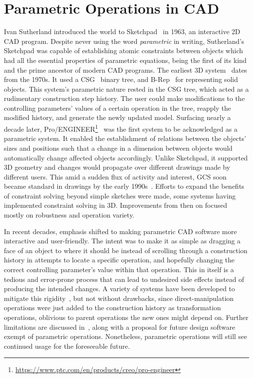 \section{Parametric Operations in CAD}%
\label{sec:intro.parametric}

Ivan Sutherland introduced the world to
Sketchpad~\cite{Sutherland:1964:Sketchpad} in 1963, an interactive 2D \ac{CAD}
program. Despite never using the word \textit{parametric} in writing,
Sutherland's Sketchpad was capable of establishing atomic constraints between
objects which had all the essential properties of parametric equations, being
the first of its kind and the prime ancestor of modern \ac{CAD} programs.  The
earliest 3D system~\cite{Requicha:1980:RRS:356827.356833} dates from the 1970s.
It used a \ac{CSG}~\cite{Requicha:1977:CSG,Foley:1996:CGPP} binary tree, and
\ac{B-Rep}~\cite{Stroud:2006:BRMT} for representing solid objects.  This
system's parametric nature rested in the \ac{CSG} tree, which acted as a
rudimentary construction step history.  The user could make modifications to the
controlling parameters' values of a certain operation in the tree, reapply the
modified history, and generate the newly updated model.  Surfacing nearly a
decade later,
Pro/ENGINEER\footnote{\url{https://www.ptc.com/en/products/creo/pro-engineer}}~\cite{Jabi:2013:PDA}
was the first system to be acknowledged as a parametric system.  It enabled the
establishment of relations between the objects' sizes and positions such that a
change in a dimension between objects would automatically change affected
objects accordingly.  Unlike Sketchpad, it supported 3D geometry and changes
would propagate over different drawings made by different users.  This amid a
sudden flux of activity and interest, \ac{GCS} soon became standard in drawings
by the early 1990s~\cite{Chung:1990:TEVPD,Owen:1991:ASGDC,Bouma:1995:GCS}.
Efforts to expand the benefits of constraint solving beyond simple sketches were
made, some systems having implemented constraint solving in 3D.  Improvements
from then on focused mostly on robustness and operation variety.

In recent decades, emphasis shifted to making parametric \ac{CAD} software more
interactive and user-friendly.  The intent was to make it as simple as dragging
a face of an object to where it should be instead of scrolling through a
construction history in attempts to locate a specific operation, and hopefully
changing the correct controlling parameter's value within that operation.  This
in itself is a tedious and error-prone process that can lead to undesired
side effects instead of producing the intended changes.  A variety of systems
have been developed to mitigate this
rigidity~\cite{Samuel:2006:CPPUP,Wu:2007:MSMSM,Clarke:2009:SM}, but not without
drawbacks, since direct-manipulation operations were just added to the
construction history as transformation operations, oblivious to parent
operations the new ones might depend on.  Further limitations are discussed
in~\cite{Bettig:2005:LPOSSD}, along with a proposal for future design software
exempt of parametric operations.  Nonetheless, parametric operations will still
see continued usage for the foreseeable future.
